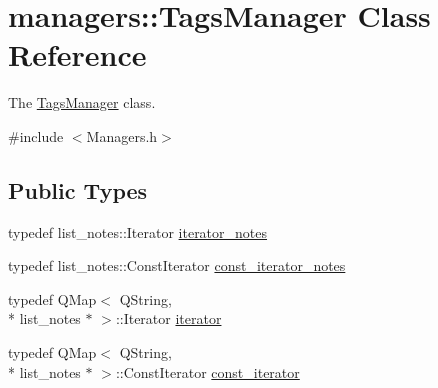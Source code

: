\hypertarget{classmanagers_1_1_tags_manager}{\section{managers\-:\-:Tags\-Manager Class Reference}
\label{classmanagers_1_1_tags_manager}
}


The \hyperlink{classmanagers_1_1_tags_manager}{Tags\-Manager} class.  




{\ttfamily \#include $<$Managers.\-h$>$}

\subsection*{Public Types}
\begin{DoxyCompactItemize}
\item 
typedef list\-\_\-notes\-::\-Iterator \hyperlink{classmanagers_1_1_tags_manager_a9d5b2971266b5836d80801a1ed2a8517}{iterator\-\_\-notes}
\item 
typedef list\-\_\-notes\-::\-Const\-Iterator \hyperlink{classmanagers_1_1_tags_manager_afb8b7b6090c26853946b86b557986d17}{const\-\_\-iterator\-\_\-notes}
\item 
typedef Q\-Map$<$ Q\-String, \\*
list\-\_\-notes $\ast$ $>$\-::Iterator \hyperlink{classmanagers_1_1_tags_manager_a7064c805f49f35cd2508b420b3bf00ed}{iterator}
\item 
typedef Q\-Map$<$ Q\-String, \\*
list\-\_\-notes $\ast$ $>$\-::Const\-Iterator \hyperlink{classmanagers_1_1_tags_manager_a6f717302ace6d00a4b8b97b60fa596f8}{const\-\_\-iterator}
\end{DoxyCompactItemize}
